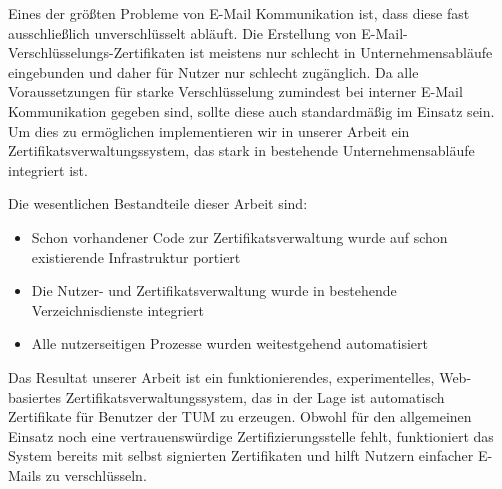 \small

Eines der größten Probleme von E-Mail Kommunikation ist, dass diese fast ausschließlich unverschlüsselt abläuft.
Die Erstellung von E-Mail-Verschlüsselungs-Zertifikaten ist meistens nur schlecht in Unternehmensabläufe eingebunden und
daher für Nutzer nur schlecht zugänglich.
Da alle Voraussetzungen für starke Verschlüsselung zumindest bei interner E-Mail Kommunikation gegeben sind, sollte
diese auch standardmäßig im Einsatz sein.
Um dies zu ermöglichen implementieren wir in unserer Arbeit ein Zertifikatsverwaltungssystem, das stark in bestehende
Unternehmensabläufe integriert ist.

Die wesentlichen Bestandteile dieser Arbeit sind:
\begin{itemize}
    \item Schon vorhandener Code zur Zertifikatsverwaltung wurde auf schon existierende Infrastruktur portiert
    \item Die Nutzer- und Zertifikatsverwaltung wurde in bestehende Verzeichnisdienste integriert
    \item Alle nutzerseitigen Prozesse wurden weitestgehend automatisiert
\end{itemize}

Das Resultat unserer Arbeit ist ein funktionierendes, experimentelles, Web-basiertes Zertifikatsverwaltungssystem, das
in der Lage ist automatisch Zertifikate für Benutzer der TUM zu erzeugen.
Obwohl für den allgemeinen Einsatz noch eine vertrauenswürdige Zertifizierungsstelle fehlt, funktioniert das System
bereits mit selbst signierten Zertifikaten und hilft Nutzern einfacher E-Mails zu verschlüsseln.
